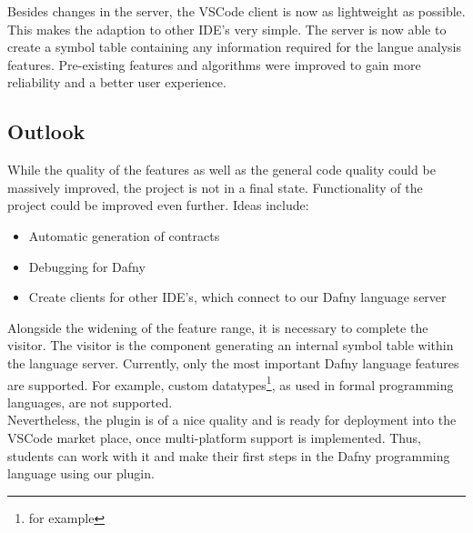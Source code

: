 Besides changes in the server, the VSCode client is now as lightweight as possible.
This makes the adaption to other IDE's very simple.
The server is now able to create a symbol table containing any information required for the langue analysis features.
Pre-existing features and algorithms were improved to gain more reliability and a better user experience.

\subsection{Outlook}
While the quality of the features as well as the general code quality could be massively improved, the project is not in a final state.
Functionality of the project could be improved even further.
Ideas include:
\begin{itemize}
    \item Automatic generation of contracts
    \item Debugging for Dafny
    \item Create clients for other IDE's, which connect to our Dafny language server
\end{itemize}

Alongside the widening of the feature range, it is necessary to complete the visitor.
The visitor is the component generating an internal symbol table within the language server.
Currently, only the most important Dafny language features are supported.
For example, custom datatypes\footnote{for example }, as used in formal programming languages, are not supported.\\

Nevertheless, the plugin is of a nice quality and is ready for deployment into the VSCode market place, once multi-platform support is implemented.
Thus, students can work with it and make their first steps in the Dafny programming language using our plugin.
